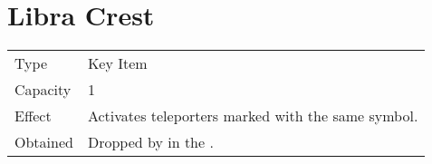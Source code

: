 \section{Libra Crest}
\label{item:libra_crest}


\noindent\begin{tabularx}{\textwidth}[l]{lX}
	Type
	& Key Item
\\
	Capacity
	& 1
\\
	Effect
	& Activates teleporters marked with the same symbol.
\\
	Obtained
	& Dropped by \nameref{monster:squidite} in the \nameref{map:wintry_cave}.
\end{tabularx}
